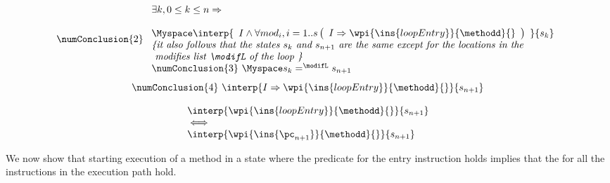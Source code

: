 \begin{enumerate}
   $$  \numConclusion{2 } \  
        \begin{array}{l}   \exists k, 0 \le k \le n \Rightarrow \\
	
	 \\
 	
      \Myspace \interp{ \begin{array}{l}
	                                    I 
					    \wedge
                                           \forall mod_i ,  i = 1..s \left( \begin{array}{l } 
	                                                           I \Rightarrow 
	                                                           \wpi{\ins{loopEntry}}{\methodd}{} 
							      \end{array}\right)
				 \end{array} }{s_k}  \\
         \mbox{\rm\textit{\{it also follows that the states $s_k$ and $s_{n+1}$ are the same except for the locations in the}}\\
        \mbox{\rm\textit{ modifies list \modifL of the loop  \}}} \\ 
 \numConclusion{3} \ 	 \Myspace    s_k =^{\modifL} s_{n+1} 
       \end{array}
    $$
 $$  \numConclusion{4} \ \interp { I \Rightarrow \wpi{\ins{loopEntry}}{\methodd}{}} {s_{n+1}}    $$
 \comment{from \numConclusion{1} and  \numConclusion{4} }
   
 $$ \begin{array}{l} 
           \interp{ \wpi{\ins{loopEntry}}{\methodd}{}}{s_{n+1}} \\
	    \iff \\
	      \interp{ \wpi{\ins{\pc_{n+1}}}{\methodd}{} }{s_{n+1}} 
    \end{array}$$
         

\end{enumerate}

\Qed

We now show that starting execution of a method in a state where the \fwpi{}
 predicate for the entry instruction holds implies that the  
\fwpi{} for all the instructions in the execution path hold. 

